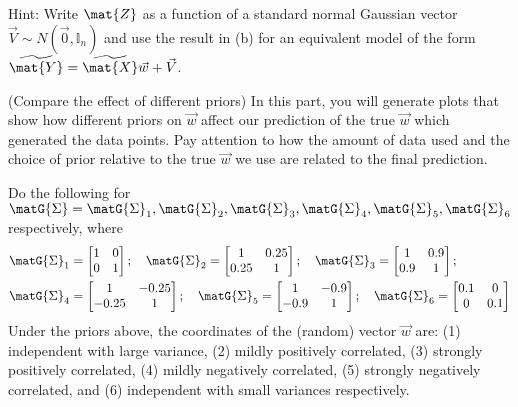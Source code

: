 \documentclass[preview]{standalone}
\begin{document}
\begin{Parts}
Hint: Write $\mat{Z}$ as a function of a standard normal Gaussian
vector $\vec{V}\sim N(\vec{0}, \mathbb{I}_n)$ and use the result in (b) for an
equivalent model of the form $\widetilde{\mat{Y}} = \widetilde{\mat{X}}\vec{w} + \vec{V}$.



\Part (Compare the effect of different priors) In this part, you will
generate plots that show how different priors on $\vec{w}$ affect our
prediction of the true $\vec{w}$ which generated the data points.  Pay
attention to how the amount of data used and the choice of prior
relative to the true $\vec{w}$ we use are related to the final
  prediction.

Do the following for
$\matG{\Sigma} = \matG{\Sigma}_1,\matG{\Sigma}_2,\matG{\Sigma}_3,\matG{\Sigma}_4,\matG{\Sigma}_5,\matG{\Sigma}_6$ respectively, where
\begin{align*}
&\matG{\Sigma}_1 = \begin{bmatrix}
    1      & 0\\
    0      & 1
    \end{bmatrix}; \quad
\matG{\Sigma}_2 = \begin{bmatrix}
1      & 0.25\\
0.25      & 1
\end{bmatrix} ; \quad
\matG{\Sigma}_3 = \begin{bmatrix}
1      & 0.9\\
0.9      & 1
\end{bmatrix} ;  \\
&\matG{\Sigma}_4 = \begin{bmatrix}
1      & -0.25\\
-0.25      & 1
\end{bmatrix}  ; \quad
\matG{\Sigma}_5 = \begin{bmatrix}
1      & -0.9\\
-0.9      & 1
\end{bmatrix} ; \quad
\matG{\Sigma}_6 = \begin{bmatrix}
0.1      & 0 \\
0      & 0.1
\end{bmatrix}
\end{align*}
Under the priors above, the coordinates of the (random) vector
$\vec{w}$ are: (1) independent with large variance, (2) mildly positively
correlated, (3) strongly positively correlated, (4) mildly negatively
correlated, (5) strongly negatively correlated, and (6) independent with
small variances respectively.



\end{Parts}
\end{document}
